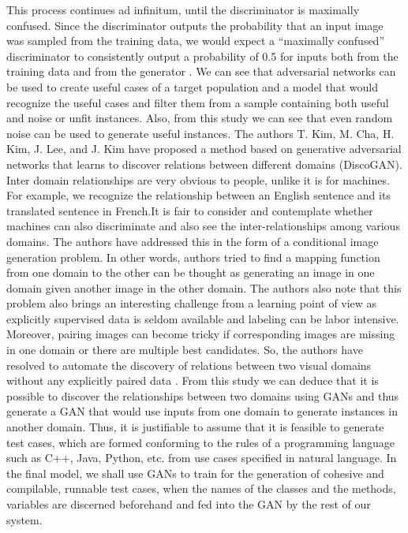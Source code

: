 \documentclass[conference, onecolumn, a4, 12pt]{IEEEtran}
\begin{document}
This process continues ad infinitum, until the discriminator is maximally confused. Since the discriminator outputs the probability that an input image was sampled from the training data, we would expect a “maximally confused” discriminator to consistently output a probability of 0.5 for inputs both from the training data and from the generator \cite{b2}. We can see that adversarial networks can be used to create useful cases of a target population and a model that would recognize the useful cases and filter them from a sample containing both useful and noise or unfit instances. Also, from this study we can see that even random noise can be used to generate useful instances.\newline
The authors T. Kim, M. Cha, H. Kim, J. Lee, and J. Kim have proposed a method based on generative adversarial networks that learns to discover relations between different domains (DiscoGAN). Inter domain relationships are very obvious to people, unlike it is for machines. For example, we recognize the relationship between an English sentence and its translated sentence in French.It is fair to consider and contemplate whether machines can also discriminate and also see the inter-relationships among various domains. The authors have addressed this in the form of a conditional image generation problem. In other words, authors tried to find a mapping function from one domain to the other can be thought as generating an image in one domain given another image in the other domain. The authors also note that this problem also brings an interesting challenge from a learning point of view as explicitly supervised data is seldom available and labeling can be labor intensive. Moreover, pairing images can become tricky if corresponding images are missing in one domain or there are multiple best candidates. So, the authors have resolved to automate the discovery of relations between two visual domains without any explicitly paired data \cite{b3}. From this study we can deduce that it is possible to discover the relationships between two domains using GANs and thus generate a GAN that would use inputs from one domain to generate instances in another domain. Thus, it is justifiable to assume that it is feasible to generate test cases, which are formed conforming to the rules of a programming language such as C++, Java, Python, etc. from use cases specified in natural language. In the final model, we shall use GANs to train for the generation of cohesive and compilable, runnable test cases, when the names of the classes and the methods, variables are discerned beforehand and fed into the GAN by the rest of our system.\newline
\end{document}
